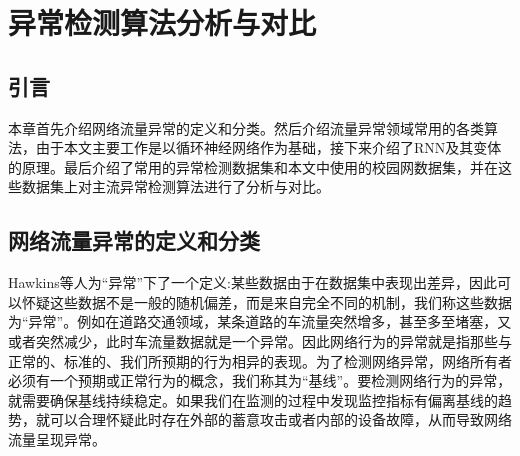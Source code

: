 
\chapter{异常检测算法分析与对比}

\section{引言}

本章首先介绍网络流量异常的定义和分类。然后介绍流量异常领域常用的各类算法，由于本文主要工作是以循环神经网络作为基础，接下来介绍了RNN及其变体的原理。最后介绍了常用的异常检测数据集和本文中使用的校园网数据集，并在这些数据集上对主流异常检测算法进行了分析与对比。










\section{网络流量异常的定义和分类}
Hawkins等人\cite{hawkins1980identification}为“异常”下了一个定义:某些数据由于在数据集中表现出差异，因此可以怀疑这些数据不是一般的随机偏差，而是来自完全不同的机制，我们称这些数据为“异常”。例如在道路交通领域，某条道路的车流量突然增多，甚至多至堵塞，又或者突然减少，此时车流量数据就是一个异常。因此网络行为的异常就是指那些与正常的、标准的、我们所预期的行为相异的表现。为了检测网络异常，网络所有者必须有一个预期或正常行为的概念，我们称其为“基线”。要检测网络行为的异常，就需要确保基线持续稳定。如果我们在监测的过程中发现监控指标有偏离基线的趋势，就可以合理怀疑此时存在外部的蓄意攻击或者内部的设备故障，从而导致网络流量呈现异常。

